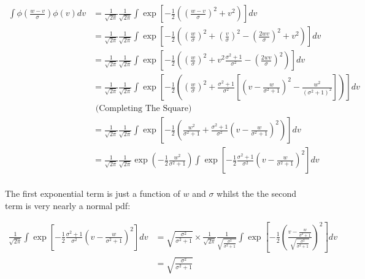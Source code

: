 \documentclass{article}
\begin{document}
\begin{align*}
\int \phi\left(\frac{w - v}{\sigma}\right) \phi(v) dv  &= 
\frac{1}{\sqrt{2\pi}} \frac{1}{\sqrt{2\pi}} 
\int \exp \left[
    -\frac{1}{2} 
    \left(
        \left(\frac{w - v}{\sigma}\right)^2 +
        v^2
    \right)
\right] dv \\
&= 
\frac{1}{\sqrt{2\pi}} \frac{1}{\sqrt{2\pi}} 
\int \exp \left[
    -\frac{1}{2} 
    \left(
        \left(\frac{w }{\sigma}\right)^2 +
        \left(\frac{v }{\sigma}\right)^2 
        -\left(\frac{2wv }{\sigma}\right)^2 +
        v^2
    \right)
\right] dv \\
&=
\frac{1}{\sqrt{2\pi}} \frac{1}{\sqrt{2\pi}} 
 \int \exp \left[
    -\frac{1}{2} 
    \left(
        \left(\frac{w }{\sigma}\right)^2 +
        v^2 \frac{\sigma^2 + 1}{\sigma^2}  
        -\left(\frac{2wv }{\sigma}\right)^2 
    \right)
\right] dv \\
&=
\frac{1}{\sqrt{2\pi}} \frac{1}{\sqrt{2\pi}} 
 \int \exp \left[
    -\frac{1}{2} 
    \left(
        \left(\frac{w }{\sigma}\right)^2 +
        \frac{\sigma^2 + 1}{\sigma^2} \left[
            \left(
                v - \frac{w}{\sigma^2 + 1}
            \right)^2 - \frac{w^2}{(\sigma^2 + 1)^2}
        \right]
    \right)
\right] dv \\ &\text{ (Completing  The Square)} \\
&=
\frac{1}{\sqrt{2\pi}} \frac{1}{\sqrt{2\pi}} 
 \int \exp \left[
    -\frac{1}{2} 
    \left(
        \frac{w^2 }{\sigma^2 + 1} +
        \frac{\sigma^2 + 1}{\sigma^2} 
            \left(
                v - \frac{w}{\sigma^2 + 1}
            \right)^2 
    \right)
\right] dv \  \\
&= 
\frac{1}{\sqrt{2\pi}} \frac{1}{\sqrt{2\pi}} 
 \exp \left(
    -\frac{1}{2} 
        \frac{w^2 }{\sigma^2 + 1}
         \right)
\int \exp\left[
    -\frac{1}{2}
        \frac{\sigma^2 + 1}{\sigma^2} 
            \left(
                v - \frac{w}{\sigma^2 + 1}
            \right)^2 
\right] dv \  \\
\end{align*}

The first exponential term is just a function of $w$ and $\sigma$ 
whilst the the second term is very nearly a normal pdf:

\begin{align*}
\frac{1}{\sqrt{2\pi}}
\int \exp\left[
    -\frac{1}{2}
        \frac{\sigma^2 + 1}{\sigma^2} 
            \left(
                v - \frac{w}{\sigma^2 + 1}
            \right)^2 
\right] dv &=  
                    \sqrt{
                        \frac{\sigma^2}{\sigma^2 + 1}
                    } \times
\frac{1}{\sqrt{2\pi}} 
\frac{1}{
                    \sqrt{
                        \frac{\sigma^2}{\sigma^2 + 1}
                    }
}
\int \exp\left[
    -\frac{1}{2}
            \left(
                \frac{v - \frac{w}{\sigma^2 + 1}}{
                    \sqrt{
                        \frac{\sigma^2}{\sigma^2 + 1}
                    }
                }
            \right)^2 
\right] dv  \\
&= 
                    \sqrt{
                        \frac{\sigma^2}{\sigma^2 + 1}
                    } 
\end{align*}
\end{document}
